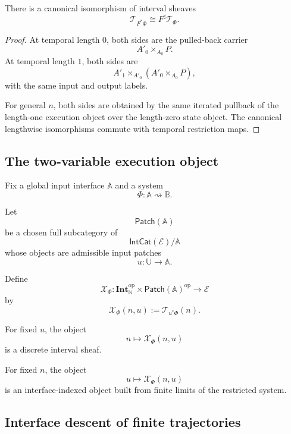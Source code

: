 \begin{theorem}
\label{thm:trajectory-semantics-input-restriction}
There is a canonical isomorphism of interval sheaves
\[
    \mathscr T_{F^\ast\Phi}
    \cong
    F^\sharp\mathscr T_\Phi.
\]
\end{theorem}

\begin{proof}
At temporal length \(0\), both sides are the pulled-back carrier
\[
    A'_0\times_{A_0}P.
\]
At temporal length \(1\), both sides are
\[
    A'_1\times_{A'_0}
    \left(
    A'_0\times_{A_0}P
    \right),
\]
with the same input and output labels.

For general \(n\), both sides are obtained by the same iterated pullback of
the length-one execution object over the length-zero state object. The
canonical lengthwise isomorphisms commute with temporal restriction maps.
\end{proof}

\subsection{The two-variable execution object}
\label{subsec:two-variable-execution-object}

Fix a global input interface \(\mathbb A\) and a system
\[
    \Phi:\mathbb A\rightsquigarrow\mathbb B.
\]

Let
\[
    \mathsf{Patch}(\mathbb A)
\]
be a chosen full subcategory of
\[
    \mathsf{IntCat}(\mathcal E)/\mathbb A
\]
whose objects are admissible input patches
\[
    u:\mathbb U\to\mathbb A.
\]

\begin{definition}
\label{def:temporal-interface-execution-object}
Define
\[
    \mathscr X_\Phi:
    \mathbf{Int}_{\mathbb N}^{\mathrm{op}}
    \times
    \mathsf{Patch}(\mathbb A)^{\mathrm{op}}
    \to
    \mathcal E
\]
by
\[
    \mathscr X_\Phi(n,u)
    :=
    \mathscr T_{u^\ast\Phi}(n).
\]
\end{definition}

For fixed \(u\), the object
\[
    n\longmapsto\mathscr X_\Phi(n,u)
\]
is a discrete interval sheaf.

For fixed \(n\), the object
\[
    u\longmapsto\mathscr X_\Phi(n,u)
\]
is an interface-indexed object built from finite limits of the restricted
system.

\subsection{Interface descent of finite trajectories}
\label{subsec:interface-descent-finite-trajectories}

